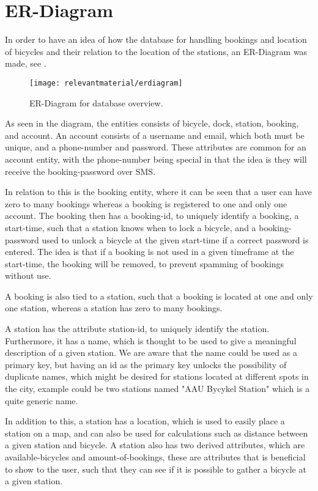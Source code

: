 \section{ER-Diagram}
In order to have an idea of how the database for handling bookings and location of bicycles and their relation to the location of the stations, an ER-Diagram was made, see .

\begin{figure}
	\centering
	\texttt{[image: relevantmaterial/erdiagram]}
	\caption{ER-Diagram for database overview.}\label{fig:er-dia}
\end{figure}

As seen in the diagram, the entities consists of bicycle, dock, station, booking, and account.
An account consists of a username and email, which both must be unique, and a phone-number and password.
These attributes are common for an account entity, with the phone-number being special in that the idea is they will receive the booking-password over SMS.

In relation to this is the booking entity, where it can be seen that a user can have zero to many bookings whereas a booking is registered to one and only one account.
The booking then has a booking-id, to uniquely identify a booking, a start-time, such that a station knows when to lock a bicycle, and a booking-password used to unlock a bicycle at the given start-time if a correct password is entered.
The idea is that if a booking is not used in a given timeframe at the start-time, the booking will be removed, to prevent spamming of bookings without use.

A booking is also tied to a station, such that a booking is located at one and only one station, whereas a station has zero to many bookings.

A station has the attribute station-id, to uniquely identify the station.
Furthermore, it has a name, which is thought to be used to give a meaningful description of a given station.
We are aware that the name could be used as a primary key, but having an id as the primary key unlocks the possibility of duplicate names, which might be desired for stations located at different spots in the city, example could be two stations named "AAU Bycykel Station" which is a quite generic name.

In addition to this, a station has a location, which is used to easily place a station on a map, and can also be used for calculations such as distance between a given station and bicycle.
A station also has two derived attributes, which are available-bicycles and amount-of-bookings, these are attributes that is beneficial to show to the user, such that they can see if it is possible to gather a bicycle at a given station.

